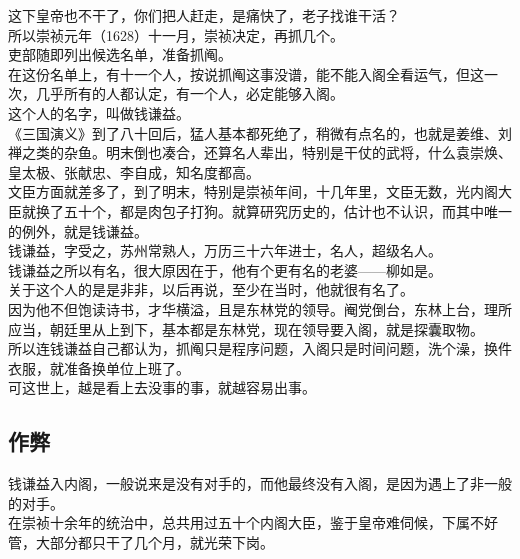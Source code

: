\begin{multicols}{\theparacolNo}
这下皇帝也不干了，你们把人赶走，是痛快了，老子找谁干活？\\

所以崇祯元年（1628）十一月，崇祯决定，再抓几个。\\

吏部随即列出候选名单，准备抓阄。\\

在这份名单上，有十一个人，按说抓阄这事没谱，能不能入阁全看运气，但这一次，几乎所有的人都认定，有一个人，必定能够入阁。\\

这个人的名字，叫做钱谦益。\\

《三国演义》到了八十回后，猛人基本都死绝了，稍微有点名的，也就是姜维、刘禅之类的杂鱼。明末倒也凑合，还算名人辈出，特别是干仗的武将，什么袁崇焕、皇太极、张献忠、李自成，知名度都高。\\

文臣方面就差多了，到了明末，特别是崇祯年间，十几年里，文臣无数，光内阁大臣就换了五十个，都是肉包子打狗。就算研究历史的，估计也不认识，而其中唯一的例外，就是钱谦益。\\

钱谦益，字受之，苏州常熟人，万历三十六年进士，名人，超级名人。\\

钱谦益之所以有名，很大原因在于，他有个更有名的老婆——柳如是。\\

关于这个人的是是非非，以后再说，至少在当时，他就很有名了。\\

因为他不但饱读诗书，才华横溢，且是东林党的领导。阉党倒台，东林上台，理所应当，朝廷里从上到下，基本都是东林党，现在领导要入阁，就是探囊取物。\\

所以连钱谦益自己都认为，抓阄只是程序问题，入阁只是时间问题，洗个澡，换件衣服，就准备换单位上班了。\\

可这世上，越是看上去没事的事，就越容易出事。\\

\subsection{作弊}
钱谦益入内阁，一般说来是没有对手的，而他最终没有入阁，是因为遇上了非一般的对手。\\

在崇祯十余年的统治中，总共用过五十个内阁大臣，鉴于皇帝难伺候，下属不好管，大部分都只干了几个月，就光荣下岗。\\


\end{multicols}
